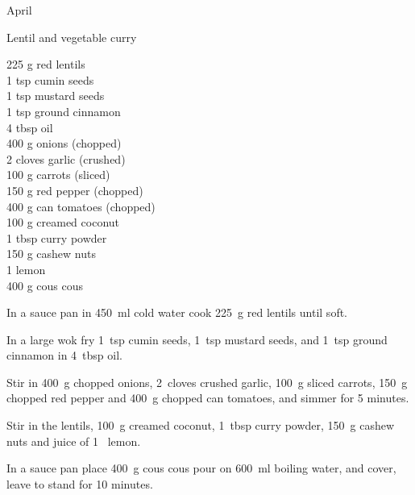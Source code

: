 \begin{menu}{April}
    \begin{recipe}{2}{Lentil and vegetable curry}%
		\begin{ingredients}
		225 g red lentils  \\
	1 tsp cumin seeds  \\
	1 tsp mustard seeds  \\
	1 tsp ground cinnamon  \\
	4 tbsp oil  \\
	400 g onions (chopped) \\
	2 cloves garlic (crushed) \\
	100 g carrots (sliced) \\
	150 g red pepper (chopped) \\
	400 g can tomatoes (chopped) \\
	100 g creamed coconut  \\
	1 tbsp curry powder  \\
	150 g cashew nuts  \\
	1  lemon  \\
	400 g cous cous  \\
	
		\end{ingredients}
	
	
    \begin{instructions}
    \item 
        In a sauce pan in
        450~ml  cold water
        cook
        225~g  red lentils
        until soft.
      \item 
        In a large wok fry
        1~tsp  cumin seeds,
        1~tsp  mustard seeds,
        and
        1~tsp  ground cinnamon
        in
        4~tbsp  oil.
      \item 
        Stir in
        400~g chopped onions,
        2~cloves crushed garlic,
        100~g sliced carrots,
        150~g chopped red pepper
        and
        400~g chopped can tomatoes,
        and simmer for 5 minutes.
      \item 
        Stir in
        the lentils,
        100~g  creamed coconut,
        1~tbsp  curry powder,
        150~g  cashew nuts
        and juice of
        1~  lemon.
      \item 
      In a
      sauce pan 
      place
      400~g  cous cous
      pour on
      600~ml  boiling water,
      and cover, leave to stand for 10 minutes.
    
    \end{instructions}
    \end{recipe}%
  

\end{menu}
